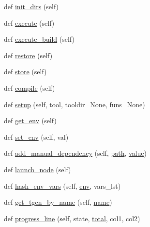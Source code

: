 \begin{DoxyCompactItemize}
\item 
def \hyperlink{classwaflib_1_1_build_1_1_build_context_adb8b13740f058cd0e790340c5f6edf06}{init\+\_\+dirs} (self)
\item 
def \hyperlink{classwaflib_1_1_build_1_1_build_context_a8ef990b5bfdcc98634c6e1248398ecc2}{execute} (self)
\item 
def \hyperlink{classwaflib_1_1_build_1_1_build_context_ab150f731e961183d0acef3aa8c38d345}{execute\+\_\+build} (self)
\item 
def \hyperlink{classwaflib_1_1_build_1_1_build_context_a9222c95f85009e82a95a4a8cbe2df934}{restore} (self)
\item 
def \hyperlink{classwaflib_1_1_build_1_1_build_context_ae39e78bf8a49550451ed42b0467fa9d5}{store} (self)
\item 
def \hyperlink{classwaflib_1_1_build_1_1_build_context_af7d834423f8c49384edaf3dbaa8c912e}{compile} (self)
\item 
def \hyperlink{classwaflib_1_1_build_1_1_build_context_ad26165fd9d32fe212a94936da03066c1}{setup} (self, tool, tooldir=None, funs=None)
\item 
def \hyperlink{classwaflib_1_1_build_1_1_build_context_a39240d22a6d298b74dabc40d8fb193a8}{get\+\_\+env} (self)
\item 
def \hyperlink{classwaflib_1_1_build_1_1_build_context_a8605b754128e554773a5962b55ec0741}{set\+\_\+env} (self, val)
\item 
def \hyperlink{classwaflib_1_1_build_1_1_build_context_aa550cf2655c922455d53077b4f1e4be1}{add\+\_\+manual\+\_\+dependency} (self, \hyperlink{classwaflib_1_1_build_1_1_build_context_afe3db622272692d0069d8b0f66c54a2c}{path}, \hyperlink{lib_2expat_8h_a4a30a13b813682e68c5b689b45c65971}{value})
\item 
def \hyperlink{classwaflib_1_1_build_1_1_build_context_a5ec1b12e273a3fcd437fd1e61292e8a1}{launch\+\_\+node} (self)
\item 
def \hyperlink{classwaflib_1_1_build_1_1_build_context_a4df53c421fdd1ea43eacfe0ec268fb07}{hash\+\_\+env\+\_\+vars} (self, \hyperlink{classwaflib_1_1_build_1_1_build_context_ac3b464a969bc6c898c739b6d820b2219}{env}, vars\+\_\+lst)
\item 
def \hyperlink{classwaflib_1_1_build_1_1_build_context_a158dba08b64d4a73b21a907ebe577017}{get\+\_\+tgen\+\_\+by\+\_\+name} (self, \hyperlink{lib_2expat_8h_a1b49b495b59f9e73205b69ad1a2965b0}{name})
\item 
def \hyperlink{classwaflib_1_1_build_1_1_build_context_af6341267231cfa8cabdfd595aede71fc}{progress\+\_\+line} (self, state, \hyperlink{classwaflib_1_1_build_1_1_build_context_a9242bac9596041fb6e91bd4f7cdbac51}{total}, col1, col2)

\end{DoxyCompactItemize}
